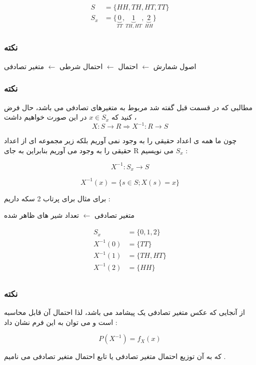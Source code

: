 \documentclass[12pt]{book}
\begin{document}
\begin{align*}
S &= \{ HH, TH, HT, TT \} \\
S_{x} &= \{ \underbrace{0}_{TT} , \underbrace{1}_{TH , HT}, \underbrace{2}_{HH} \}
\end{align*}


\subsubsection{نکته}

اصول شمارش $\leftarrow$ احتمال   $\leftarrow$  احتمال شرطی  $\leftarrow$  متغیر تصادفی 



\subsubsection{نکته}

مطالبی که در قسمت قبل گفته شد مربوط به متغیرهای تصادفی می باشد، حال فرض کنید که $x \in S_{x}$ در این صورت خواهیم داشت ، 
$$
X : S \to R \Rightarrow X^{-1} : R \to S
$$

چون ما همه ی اعداد حقیقی را به وجود نمی آوریم بلکه زیر مجموعه ای از اعداد حقیقی را به وجود می آوریم بنابراین به جای R می نویسیم $S_{x}$ :

$$
X^{-1} : S_{x} \to S
$$

$$
X^{-1}(x) = \{ s \in S ; X(s) = x \}
$$


برای مثال برای پرتاب 2 سکه داریم :

متغیر تصادفی $\leftarrow$ تعداد شیر های ظاهر شده

\begin{align*}
S_{x} &= \{ 0 , 1 , 2 \} \\
X^{-1}(0) &= \{ TT \} \\
X^{-1}(1) &= \{ TH, HT \} \\
X^{-1}(2) &= \{ HH \} \\
\end{align*} 


\subsubsection{نکته}

از آنجایی که عکس متغیر تصادفی یک پیشامد می باشد، لذا احتمال آن قابل محاسبه است و می توان به این فرم نشان داد :

$$
P ( X^{-1} ) = f_{X}(x)
$$

که به آن توزیع احتمال متغیر تصادفی یا تابع احتمال متغیر تصادفی می نامیم .
\end{document}
